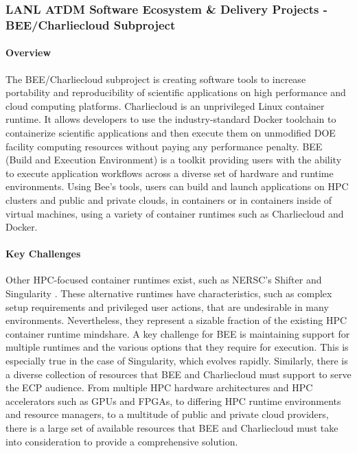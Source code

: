 \subsubsection{ LANL ATDM Software Ecosystem \& Delivery Projects - BEE/Charliecloud Subproject} 

\paragraph{Overview}
The BEE/Charliecloud subproject is creating software tools to increase portability
and reproducibility of scientific applications on high performance and cloud
computing platforms.  Charliecloud \cite{priedhorskyrrandlestc2016} is an unprivileged Linux container
runtime.  It allows developers to use the industry-standard Docker
\cite{dockerinc}
toolchain to containerize scientific applications and then execute them on
unmodified DOE facility computing resources without paying any performance
penalty.  BEE \cite{beeproject} (Build and Execution Environment) is a toolkit providing
users with the ability to execute application workflows across a diverse set of
hardware and runtime environments.  Using Bee's tools, users can build and
launch applications on HPC clusters and public and private clouds, in
containers or in containers inside of virtual machines, using a variety of
container runtimes such as Charliecloud and Docker. 

\paragraph{Key Challenges}
Other HPC-focused container runtimes exist, such as NERSC's Shifter
\cite{canonrsjacobsend} and
Singularity \cite{kurtzergmsochatvbauermw}.  These alternative runtimes have characteristics, such as
complex setup requirements and privileged user actions, that are undesirable in
many environments.  Nevertheless, they represent a sizable fraction of the
existing HPC container runtime mindshare.  A key challenge for BEE is
maintaining support for multiple runtimes and the various options that they require
for execution.  This is especially true in the case of Singularity, which
evolves rapidly.  Similarly, there is a diverse collection of resources that
BEE and Charliecloud must support to serve the ECP audience.  From multiple HPC
hardware architectures and HPC accelerators such as GPUs and FPGAs, to
differing HPC runtime environments and resource managers, to a multitude of
public and private cloud providers, there is a large set of available resources
that BEE and Charliecloud must take into consideration to provide a
comprehensive solution.

